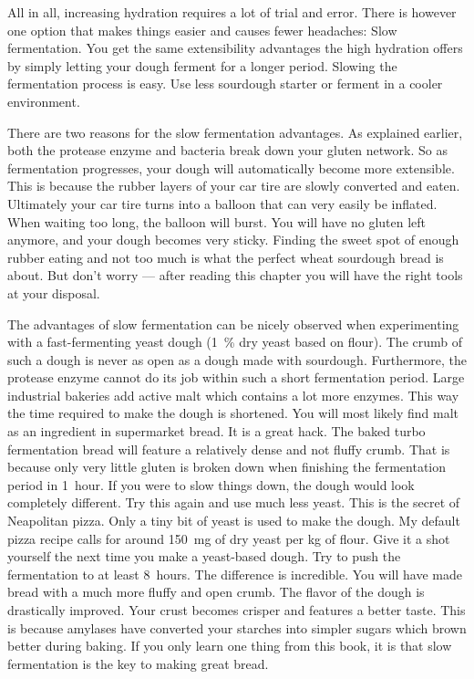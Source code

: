 All in all, increasing hydration requires a lot of trial and error. There
is however one option that makes things easier and causes fewer headaches:
Slow fermentation. You get the same extensibility advantages the high hydration
offers by simply letting your dough ferment for a longer period.
Slowing the fermentation process is easy. Use less
sourdough starter or ferment in a cooler environment.

There are two reasons for the slow fermentation advantages.
As explained earlier, both the protease enzyme and bacteria break down your
gluten network. So as fermentation progresses, your dough will automatically
become more extensible. This is because the rubber layers of your car tire
are slowly converted and eaten. Ultimately your car tire turns into a balloon
that can very easily be inflated. When waiting too long, the
balloon will burst. You will have no gluten left anymore, and your dough
becomes very sticky. Finding the sweet spot of enough rubber eating and not
too much is what the perfect wheat sourdough bread is about. But don't worry --- after reading
this chapter you will have the right tools at your disposal.

The advantages of slow fermentation can be nicely observed when experimenting
with a fast-fermenting yeast dough (\qty{1}{\percent} dry yeast based on flour). The
crumb of such a dough is never as
open as a dough made with sourdough. Furthermore, the protease enzyme
cannot do its job within such a short fermentation period.
Large industrial bakeries add active malt which contains a
lot more enzymes. This way the time required to make the dough is shortened. You
will most likely find malt as an ingredient in supermarket bread. It is a
great hack. The baked turbo fermentation bread will feature a relatively dense
and not fluffy crumb. That is because only very little gluten is broken down when
finishing the fermentation period in 1~hour. If you were to slow things down,
the dough would look completely different.
Try this again and use much less yeast. This is the
secret of Neapolitan pizza. Only a tiny bit of yeast is used to make the
dough. My default pizza recipe calls for around \qty{150}{\mg} of dry
yeast per \unit{\kg} of flour. Give it a shot yourself the next time you
make a yeast-based dough. Try to push the fermentation to at least 8~hours.
The difference is incredible. You will have made bread with a much more
fluffy and open crumb. The flavor of the dough is drastically improved. Your
crust becomes crisper and features a better taste. This is because amylases have
converted your starches into simpler sugars which brown better during baking.
If you only learn one thing from this book, it is that slow fermentation is
the key to making great bread.

